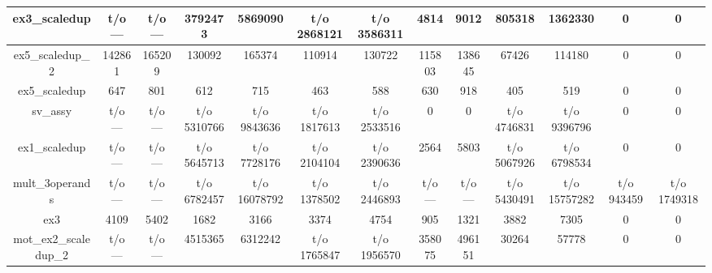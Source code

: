 \begin{table}[t]
\begin{tabular}{|c|c|c|c|c|c|c|c|c|c|c|c|c|}
ex3\_scaledup         & t/o ---        & t/o ---       & 3792473         & 5869090         & t/o 2868121    & t/o 3586311    & 4814           & 9012          & 805318          & 1362330         & 0              & 0              \\ \hline
ex5\_scaledup\_2      & 142861         & 165209        & 130092          & 165374          & 110914         & 130722         & 115803         & 138645        & 67426           & 114180          & 0              & 0              \\ \hline
ex5\_scaledup         & 647            & 801           & 612             & 715             & 463            & 588            & 630            & 918           & 405             & 519             & 0              & 0              \\ \hline
sv\_assy              & t/o ---        & t/o ---       & t/o 5310766     & t/o 9843636     & t/o 1817613    & t/o 2533516    & 0              & 0             & t/o 4746831     & t/o 9396796     & 0              & 0              \\ \hline
ex1\_scaledup         & t/o ---        & t/o ---       & t/o 5645713     & t/o 7728176     & t/o 2104104    & t/o 2390636    & 2564           & 5803          & t/o 5067926     & t/o 6798534     & 0              & 0              \\ \hline
mult\_3operands       & t/o ---        & t/o ---       & t/o 6782457     & t/o 16078792    & t/o 1378502    & t/o 2446893    & t/o ---        & t/o ---       & t/o 5430491     & t/o 15757282    & t/o 943459     & t/o 1749318    \\ \hline
ex3                   & 4109           & 5402          & 1682            & 3166            & 3374           & 4754           & 905            & 1321          & 3882            & 7305            & 0              & 0              \\ \hline
mot\_ex2\_scaledup\_2 & t/o ---        & t/o ---       & 4515365         & 6312242         & t/o 1765847    & t/o 1956570    & 358075         & 496151        & 30264           & 57778           & 0              & 0              \\ \hline
\end{tabular}
\end{table}
